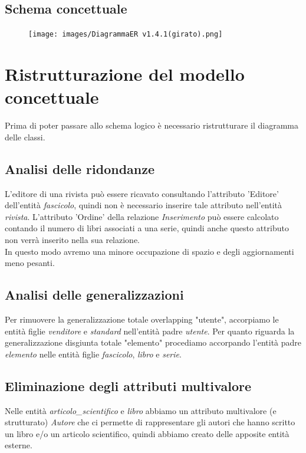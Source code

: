 \documentclass{article}
\begin{document}
\newpage
\subsection{Schema concettuale}
\begin{figure}[htp!]
    \texttt{[image: images/DiagrammaER v1.4.1(girato).png]}
\end{figure}

\newpage
\section{Ristrutturazione del modello concettuale}
Prima di poter passare allo schema logico è necessario ristrutturare il diagramma delle classi.

\subsection{Analisi delle ridondanze}
L'editore di una rivista può essere ricavato consultando l'attributo 'Editore' dell'entità \textit{fascicolo}, quindi non è necessario inserire tale attributo nell'entità \textit{rivista}. L'attributo 'Ordine' della relazione \textit{Inserimento} può essere calcolato contando il numero di libri associati a una serie, quindi anche questo attributo non verrà inserito nella sua relazione.\\ In questo modo avremo una minore occupazione di spazio e degli aggiornamenti meno pesanti.

\subsection{Analisi delle generalizzazioni}
Per rimuovere la generalizzazione totale overlapping "utente", accorpiamo le entità figlie \textit{venditore} e \textit{standard} nell'entità padre \textit{utente}.
Per quanto riguarda la generalizzazione disgiunta totale "elemento" procediamo accorpando l'entità padre \textit{elemento} nelle entità figlie \textit{fascicolo}, \textit{libro} e \textit{serie}.

\subsection{Eliminazione degli attributi multivalore}
Nelle entità \textit{articolo\_scientifico} e \textit{libro} abbiamo un attributo multivalore (e strutturato) \textit{Autore} che ci permette di rappresentare gli autori che hanno scritto un libro e/o un articolo scientifico, quindi abbiamo creato delle apposite entità esterne.
\end{document}
